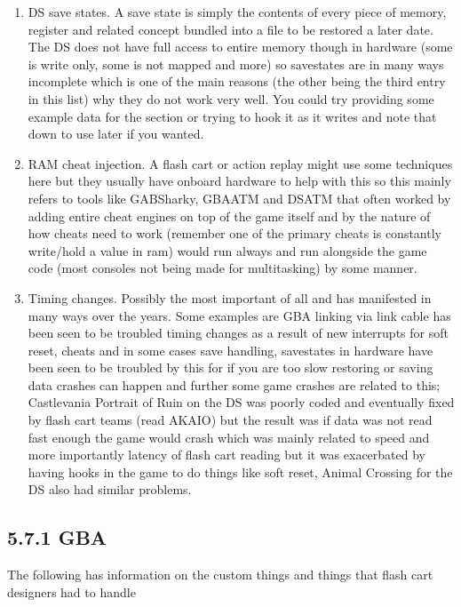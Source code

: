 \documentclass[
]{book}
\providecommand{\tightlist}{%
  \setlength{\itemsep}{0pt}\setlength{\parskip}{0pt}}
\begin{document}
\begin{enumerate}
\def\labelenumi{\arabic{enumi}.}
\tightlist
\item
  DS save states. A save state is simply the contents of every piece of memory, register and related concept bundled into a file to be restored a later date. The DS does not have full access to entire memory though in hardware (some is write only, some is not mapped and more) so savestates are in many ways incomplete which is one of the main reasons (the other being the third entry in this list) why they do not work very well. You could try providing some example data for the section or trying to hook it as it writes and note that down to use later if you wanted.
\item
  RAM cheat injection. A flash cart or action replay might use some techniques here but they usually have onboard hardware to help with this so this mainly refers to tools like GABSharky, GBAATM and DSATM that often worked by adding entire cheat engines on top of the game itself and by the nature of how cheats need to work (remember one of the primary cheats is constantly write/hold a value in ram) would run always and run alongside the game code (most consoles not being made for multitasking) by some manner.
\item
  Timing changes. Possibly the most important of all and has manifested in many ways over the years. Some examples are GBA linking via link cable has been seen to be troubled timing changes as a result of new interrupts for soft reset, cheats and in some cases save handling, savestates in hardware have been seen to be troubled by this for if you are too slow restoring or saving data crashes can happen and further some game crashes are related to this; Castlevania Portrait of Ruin on the DS was poorly coded and eventually fixed by flash cart teams (read AKAIO) but the result was if data was not read fast enough the game would crash which was mainly related to speed and more importantly latency of flash cart reading but it was exacerbated by having hooks in the game to do things like soft reset, Animal Crossing for the DS also had similar problems.
\end{enumerate}

\hypertarget{gba-1}{%
\subsection{5.7.1 GBA}\label{gba-1}}

The following has information on the custom things and things that flash cart designers had to handle
\end{document}

